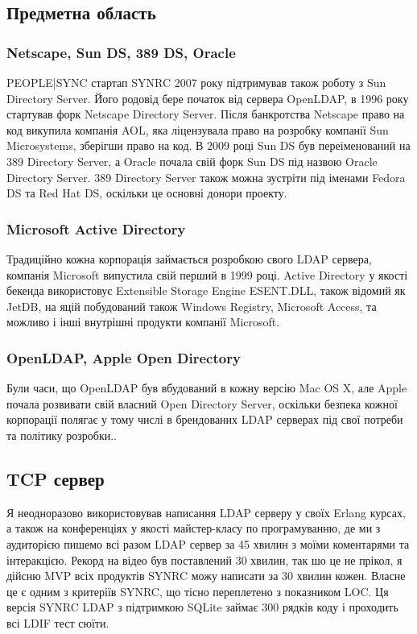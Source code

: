 \subsection{Предметна область}

\subsubsection{Netscape, Sun DS, 389 DS, Oracle}

PEOPLE|SYNC стартап SYNRC 2007 року підтримував також роботу з Sun Directory Server. Його родовід бере початок від сервера OpenLDAP, в 1996 року стартував форк Netscape Directory Server. Після банкротства Netscape право на код викупила компанія AOL, яка ліцензувала право на розробку компанії Sun Microsystems, зберігши право на код. В 2009 році Sun DS був переіменований на 389 Directory Server, а Oracle почала свій форк Sun DS під назвою Oracle Directory Server. 389 Directory Server також можна зустріти під іменами Fedora DS та Red Hat DS, оскільки це основні донори проекту.

\subsubsection{Microsoft Active Directory}

Традиційно кожна корпорація займається розробкою свого LDAP сервера, компанія Microsoft випустила свій перший в 1999 році. Active Directory у якості бекенда використовує Extensible Storage Engine ESENT.DLL, також відомий як JetDB, на яцій побудований також Windows Registry, Microsoft Access, та можливо і інші внутрішні продукти компанії Microsoft.

\subsubsection{OpenLDAP, Apple Open Directory}

Були часи, що OpenLDAP був вбудований в кожну версію Mac OS X, але Apple почала розвивати свій власний Open Directory Server, оскільки безпека кожної корпорації полягає у тому числі в брендованих LDAP серверах під свої потреби та політику розробки..

\subsection{TCP сервер}

Я неодноразово використовував написання LDAP серверу у своїх Erlang курсах, а також на конференціях у якості майстер-класу по програмуванню, де ми з аудиторією пишемо всі разом LDAP сервер за 45 хвилин з моїми коментарями та інтеракцією. Рекорд на відео був поставлений 30 хвилин, так шо це не прікол, я дійсню MVP всіх продуктів SYNRC можу написати за 30 хвилин кожен. Власне це є одним з критеріїв SYNRC, що тісно переплетено з показником LOC. Ця версія SYNRC LDAP з підтримкою SQLite займає 300 рядків коду і проходить всі LDIF тест сюїти.

